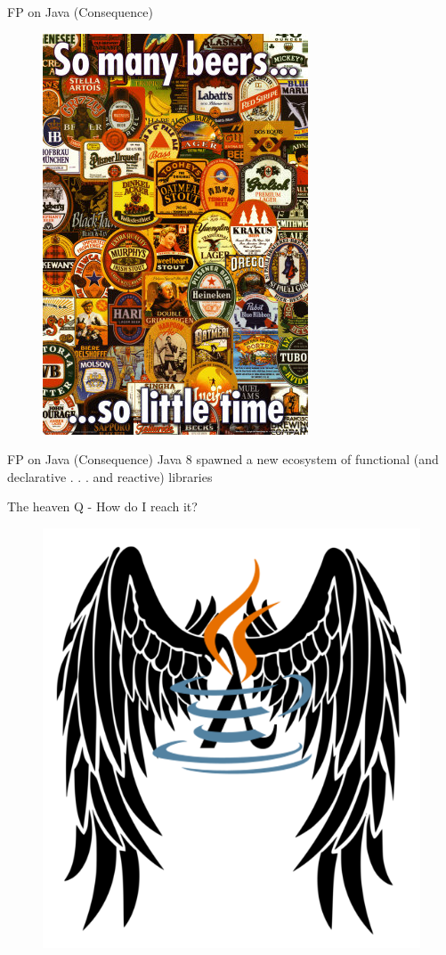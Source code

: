 \documentclass[14pt]{beamer}
\begin{document}
\begin{frame}{FP on Java (Consequence)}
    \begin{figure}
        \centering
        \includegraphics[width=0.45\linewidth]{Images/somany}
    \end{figure}
\end{frame}

\begin{frame}{FP on Java (Consequence)}
	\huge Java 8 spawned a new ecosystem of functional (and declarative . . . and reactive) libraries
\end{frame}

\begin{frame}{The heaven}
    \huge Q - How do I reach it?
        \begin{figure}
        \centering
        \includegraphics[width=0.6\linewidth]{Images/angel}
    \end{figure}
\end{frame}
\end{document}
